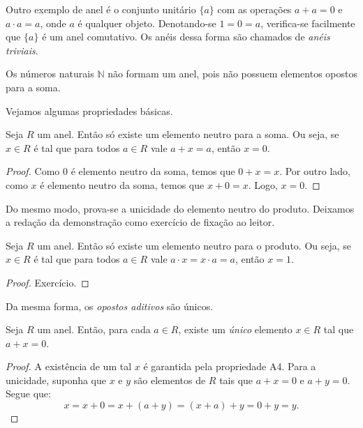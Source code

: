 Outro exemplo de anel é o conjunto unitário $\{a\}$ com as operações $a+a=0$ e $a\cdot a=a$, onde $a$ é qualquer objeto. Denotando-se $1=0=a$, verifica-se facilmente que $\{a\}$ é um anel comutativo.
Os anéis dessa forma são chamados de \emph{anéis triviais}.

Os números naturais $\mathbb{N}$ não formam um anel, pois não possuem elementos opostos para a soma.

Vejamos algumas propriedades básicas.

\begin{proposition}
    Seja $R$ um anel. Então só existe um elemento neutro para a soma.
    Ou seja, se $x \in R$ é tal que para todos $a \in R$ vale $a+x=a$, então $x=0$.
\end{proposition}
\begin{proof}
    Como $0$ é elemento neutro da soma, temos que $0+x=x$.
    Por outro lado, como $x$ é elemento neutro da soma, temos que $x+0=x$.
    Logo, $x=0$.
\end{proof}

Do mesmo modo, prova-se a unicidade do elemento neutro do produto.
Deixamos a redação da demonstração como exercício de fixação ao leitor. 

\begin{proposition}\label{proposition:unicidadeNeutroProduto}
    Seja $R$ um anel.
    Então só existe um elemento neutro para o produto.
    Ou seja, se $x \in R$ é tal que para todos $a \in R$ vale $a\cdot x=x\cdot a=a$, então $x=1$.
\end{proposition}
\begin{proof}
    Exercício.
\end{proof}



Da mesma forma, os \emph{opostos aditivos} são únicos.

\begin{proposition}
    Seja $R$ um anel.
    Então, para cada $a \in R$, existe um \emph{único} elemento $x \in R$ tal que $a+x=0$.
\end{proposition}
\begin{proof}
    A existência de um tal $x$ é garantida pela propriedade A4.
    Para a unicidade, suponha que $x$ e $y$ são elementos de $R$ tais que $a+x=0$ e $a+y=0$.
    Segue que:
    \begin{equation*}
        x=x+0=x+(a+y)=(x+a)+y=0+y=y.
    \end{equation*}
\end{proof}

